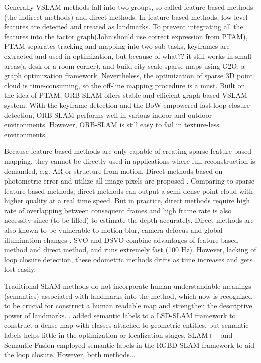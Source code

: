 \documentclass[journal]{IEEEtran}
\begin{document}
Generally VSLAM methods fall into two groups, so called feature-based methods (the indirect methods) and direct methods. 
In feature-based methods, low-level features are detected and treated as landmarks. 
To prevent integrating all the features into the factor graph(John:should use correct expression from PTAM), PTAM\cite{Klein2007Parallel} separates tracking and mapping into two sub-tasks, keyframes are extracted and used in optimization, but because of what?? it still works in small areas(a desk or a room corner). 
\cite{Lategahn2012City} and \cite{Lategahn2014Vision} build city-scale sparse maps using G2O, a graph optimization framework\citep{K2011G2o}. 
Nevertheless, the optimization of sparse 3D point cloud is time-consuming, so the off-line mapping procedure is a must. Built on the idea of PTAM\cite{Klein2007Parallel}, ORB-SLAM \cite{Mur2017ORB} offers stable and efficient graph-based VSLAM system.
With the keyframe detection and the BoW-empowered fast loop closure detection, ORB-SLAM performs well in various indoor and outdoor environments. 
However, ORB-SLAM is still easy to fail in texture-less environments.

%

Because feature-based methods are only capable of creating sparse feature-based mapping, they cannot be directly used in applications where full reconstruction is demanded, e.g. AR or structure from motion.
Direct methods based on photometric error and utilize all image pixels are proposed \citep{Engel2014LSD}.
Comparing to sparse feature-based methods, direct methods can output a semi-dense point cloud with higher quality at a real time speed. 
But in practice, direct methods require high rate of overlapping between consequent frames and high frame rate is also necessity since (to be filled) to estimate the depth accurately.
Direct methods are also known to be vulnerable to motion blur, camera defocus and global illumination changes \cite{Newcombe2011DTAM}. 
SVO \cite{Forster2013SVO} and DSVO\cite{} combine advantages of feature-based method and direct method, and runs extremely fast (100 Hz). 
However, lacking of loop closure detection, these odometric methods drifts as time increases and gets lost easily.
	

Traditional SLAM methods do not incorporate human understandable meanings (semantics) associated with landmarks into the method, which now is recognized to be crucial for construct a human readable map and strengthen the descriptive power of landmarks\citep{}.
\cite{Cadena:2016fp}. \cite{Li2016Semi} added semantic labels to a LSD-SLAM framework to construct a dense map with classes attached to geometric entities, but semantic labels helps little in the optimization or localization stages.
SLAM++ \cite{Salas2013SLAM} and Semantic Fusion \cite{Mccormac2017SemanticFusion} employed semantic labels in the RGBD SLAM framework to aid the loop closure. 
However, both methods...
\end{document}

